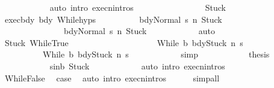 \begin{isabellebody}
\ \ \ \ \ \ \ \ \ \ \isamarkupfalse%
\ {\isacharparenleft}auto\ intro{\isacharcolon}\ execn{\isachardot}intros{\isacharparenright}\isanewline
\ \ \ \ \ \ \isamarkupfalse%
\isanewline
\ \ \ \ \ \ \ \ \isamarkupfalse%
\ Stuck\isanewline
\ \ \ \ \ \ \ \ \isamarkupfalse%
\ exec{\isacharunderscore}bdy\ bdy\ While{\isachardot}hyps\isanewline
\ \ \ \ \ \ \ \ \isamarkupfalse%
\ {\isachardoublequoteopen}{\isasymGamma}{\isasymturnstile}{\isasymlangle}bdy{}{\isacharcomma}Normal\ s{\isasymrangle}\ {\isacharequal}n{\isasymRightarrow}\ Stuck{\isachardoublequoteclose}\ \isanewline
\ \ \ \ \ \ \ \ \ \ \ \ \ \ \ {\isachardoublequoteopen}{\isasymGamma}{\isasymturnstile}{\isasymlangle}bdy{}{\isacharcomma}Normal\ s{\isasymrangle}\ {\isacharequal}n{\isasymRightarrow}\ Stuck{\isachardoublequoteclose}\isanewline
\ \ \ \ \ \ \ \ \ \ \isamarkupfalse%
\ auto\isanewline
\ \ \ \ \ \ \ \ \isamarkupfalse%
\isanewline
\ \ \ \ \ \ \ \ \isamarkupfalse%
\ Stuck\ WhileTrue\isanewline
\ \ \ \ \ \ \ \ \isamarkupfalse%
\ \isanewline
\ \ \ \ \ \ \ \ \ \ {\isachardoublequoteopen}{\isasymGamma}{\isasymturnstile}{\isasymlangle}While\ b\ bdy{}{\isacharcomma}Stuck{\isasymrangle}\ {\isacharequal}n{\isasymRightarrow}\ s{\isacharprime}{\isacharprime}{\isachardoublequoteclose}\ \isanewline
\ \ \ \ \ \ \ \ \ \ {\isachardoublequoteopen}{\isasymGamma}{\isasymturnstile}{\isasymlangle}While\ b\ bdy{}{\isacharcomma}Stuck{\isasymrangle}\ {\isacharequal}n{\isasymRightarrow}\ s{\isacharprime}{\isacharprime}{\isachardoublequoteclose}\isanewline
\ \ \ \ \ \ \ \ \ \ \isamarkupfalse%
\ simp\isanewline
\ \ \ \ \ \ \ \ \isamarkupfalse%
\ \isamarkupfalse%
\ {\isacharquery}thesis\isanewline
\ \ \ \ \ \ \ \ \ \ \isamarkupfalse%
\ s{\isacharunderscore}in{\isacharunderscore}b\ Stuck\isanewline
\ \ \ \ \ \ \ \ \ \ \isamarkupfalse%
\ {\isacharparenleft}auto\ intro{\isacharcolon}\ execn{\isachardot}intros{\isacharparenright}\isanewline
\ \ \ \ \ \ \isamarkupfalse%
\isanewline
\ \ \ \ \isamarkupfalse%
\isanewline
\ \ \ \ \ \ \isamarkupfalse%
\ WhileFalse\ \isamarkupfalse%
\ {\isacharquery}case\ \isamarkupfalse%
\ {\isacharparenleft}auto\ intro{\isacharcolon}\ execn{\isachardot}intros{\isacharparenright}\isanewline
\ \ \ \ \isamarkupfalse%
\ {\isacharparenleft}simp{\isacharunderscore}all{\isacharparenright}\ \ \isanewline

\end{isabellebody}
